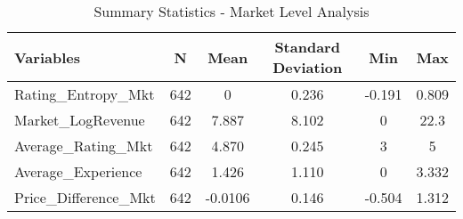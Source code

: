 \begin{table}[H]
\centering

\begin{tabular}{@{}lccccc@{}}
\toprule
Variables            & N   & Mean   & Standard Deviation & Min    & Max   \\ \midrule
Rating\_Entropy\_Mkt & 642 & 0  & 0.236              & -0.191  & 0.809    \\
Market\_LogRevenue   & 642 & 7.887  & 8.102               & 0      & 22.3  \\
Average\_Rating\_Mkt & 642 & 4.870  & 0.245              & 3      & 5     \\
Average\_Experience  & 642 & 1.426 & 1.110              & 0      & 3.332    \\
Price\_Difference\_Mkt    & 642 & -0.0106 & 0.146              & -0.504 & 1.312 \\ \bottomrule
\end{tabular}%

\caption{Summary Statistics - Market Level Analysis}
\label{sumstats_mkt}
\end{table} 